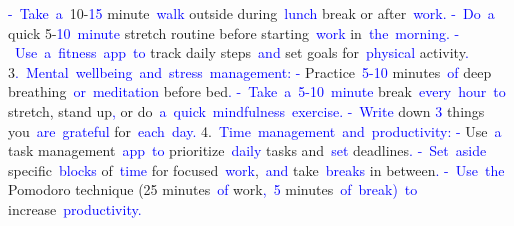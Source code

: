 \documentclass{article}
\begin{document}
\begin{tcolorbox}[colframe=black,colback=white]
{}\textcolor{blue}{-}\textcolor{blue}{~Take}\textcolor{blue}{~a}\textcolor{blue}{~}10-\textcolor{blue}{15} minute\textcolor{blue}{~walk} outside during\textcolor{blue}{~lunch} break or after\textcolor{blue}{~work}\textcolor{blue}{.
}\textcolor{blue}{-}\textcolor{blue}{~Do}\textcolor{blue}{~a} quick 5-\textcolor{blue}{10}\textcolor{blue}{~minute} stretch routine before starting\textcolor{blue}{~work} in\textcolor{blue}{~the}\textcolor{blue}{~morning}\textcolor{blue}{.
}\textcolor{blue}{-}\textcolor{blue}{~Use}\textcolor{blue}{~a}\textcolor{blue}{~fitness}\textcolor{blue}{~app}\textcolor{blue}{~to} track daily steps\textcolor{blue}{~and} set goals for\textcolor{blue}{~physical} activity\textcolor{blue}{.
}3\textcolor{blue}{.}\textcolor{blue}{~Mental}\textcolor{blue}{~wellbeing}\textcolor{blue}{~and}\textcolor{blue}{~stress}\textcolor{blue}{~management}\textcolor{blue}{:
}\textcolor{blue}{-} Practice\textcolor{blue}{~}\textcolor{blue}{5}\textcolor{blue}{-}\textcolor{blue}{10} minutes\textcolor{blue}{~of} deep breathing\textcolor{blue}{~or}\textcolor{blue}{~meditation} before bed\textcolor{blue}{.
}\textcolor{blue}{-}\textcolor{blue}{~Take}\textcolor{blue}{~a}\textcolor{blue}{~}\textcolor{blue}{5}\textcolor{blue}{-}\textcolor{blue}{10}\textcolor{blue}{~minute} break\textcolor{blue}{~every}\textcolor{blue}{~hour}\textcolor{blue}{~to} stretch, stand up\textcolor{blue}{,} or do\textcolor{blue}{~a}\textcolor{blue}{~quick}\textcolor{blue}{~mindfulness}\textcolor{blue}{~exercise}\textcolor{blue}{.
}\textcolor{blue}{-}\textcolor{blue}{~Write} down \textcolor{blue}{3} things you\textcolor{blue}{~are}\textcolor{blue}{~grateful} for\textcolor{blue}{~each}\textcolor{blue}{~day}\textcolor{blue}{.
}4.\textcolor{blue}{~Time}\textcolor{blue}{~management}\textcolor{blue}{~and}\textcolor{blue}{~productivity}\textcolor{blue}{:
}\textcolor{blue}{-} Use\textcolor{blue}{~a} task management\textcolor{blue}{~app}\textcolor{blue}{~to} prioritize\textcolor{blue}{~daily} tasks and\textcolor{blue}{~set} deadlines\textcolor{blue}{.
}\textcolor{blue}{-}\textcolor{blue}{~Set}\textcolor{blue}{~aside} specific\textcolor{blue}{~blocks} of\textcolor{blue}{~time} for focused\textcolor{blue}{~work},\textcolor{blue}{~and} take\textcolor{blue}{~breaks} in between\textcolor{blue}{.
}\textcolor{blue}{-}\textcolor{blue}{~Use}\textcolor{blue}{~the} Pomodoro technique (25 minutes\textcolor{blue}{~of} work\textcolor{blue}{,}\textcolor{blue}{~}\textcolor{blue}{5} minutes\textcolor{blue}{~of}\textcolor{blue}{~break}\textcolor{blue}{)}\textcolor{blue}{~to} increase\textcolor{blue}{~productivity}\textcolor{blue}{.
}
\end{tcolorbox}
\end{document}
